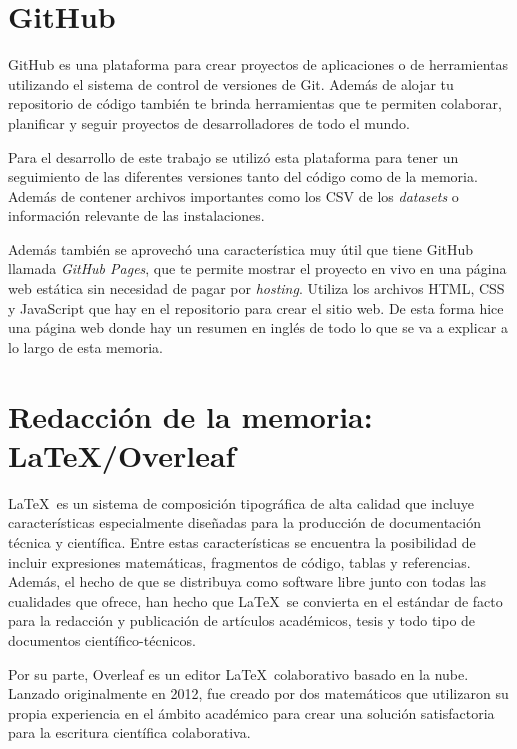 \documentclass[a4paper, 12pt]{book}
\begin{document}
\section{GitHub}
\label{sec:github}

GitHub es una plataforma para crear proyectos de aplicaciones o de herramientas utilizando el sistema de control de versiones de Git. Además de alojar tu repositorio de código también te brinda herramientas que te permiten colaborar, planificar y seguir proyectos de desarrolladores de todo el mundo.

Para el desarrollo de este trabajo se utilizó esta plataforma para tener un seguimiento de las diferentes versiones tanto del código como de la memoria. Además de contener archivos importantes como los CSV de los \textit{datasets} o información relevante de las instalaciones.

Además también se aprovechó una característica muy útil que tiene GitHub llamada \textit{GitHub Pages}, que te permite mostrar el proyecto en vivo en una página web estática sin necesidad de pagar por \textit{hosting}. Utiliza los archivos HTML, CSS y JavaScript que hay en el repositorio para crear el sitio web. De esta forma hice una página web donde hay un resumen en inglés de todo lo que se va a explicar a lo largo de esta memoria. 

\section{Redacción de la memoria: \LaTeX/Overleaf}
\label{sec:redaccion_de_la_memoria}

\LaTeX~es un sistema de composición tipográfica de alta calidad que incluye características especialmente diseñadas para la producción de documentación técnica y científica. Entre estas características se encuentra la posibilidad de incluir expresiones matemáticas, fragmentos de código, tablas y referencias. Además, el hecho de que se distribuya como software libre junto con todas las cualidades que ofrece, han hecho que \LaTeX~se convierta en el estándar de facto para la redacción y publicación de artículos académicos, tesis y todo tipo de documentos científico-técnicos. 

Por su parte, Overleaf es un editor \LaTeX~colaborativo basado en la nube. Lanzado originalmente en 2012, fue creado por dos matemáticos que utilizaron su propia experiencia en el ámbito académico para crear una solución satisfactoria para la escritura científica colaborativa.
\end{document}
